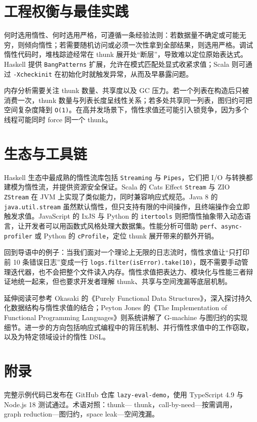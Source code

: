 \chapter{工程权衡与最佳实践}
何时选用惰性、何时选用严格，可遵循一条经验法则：若数据量不确定或可能无穷，则倾向惰性；若需要随机访问或必须一次性拿到全部结果，则选用严格。调试惰性代码时，堆栈踪迹经常在 thunk 展开处“断层”，导致难以定位原始表达式。Haskell 提供 \texttt{BangPatterns} 扩展，允许在模式匹配处显式收紧求值；Scala 则可通过 \texttt{-Xcheckinit} 在初始化时就触发异常，从而及早暴露问题。\par
内存分析需要关注 thunk 数量、共享度以及 GC 压力。若一个列表在构造后只被消费一次，thunk 数量与列表长度呈线性关系；若多处共享同一列表，图归约可把空间复杂度降到 \texttt{O(1)}。在高并发场景下，惰性求值还可能引入锁竞争，因为多个线程可能同时 force 同一个 thunk。\par
\chapter{生态与工具链}
Haskell 生态中最成熟的惰性流库包括 \texttt{Streaming} 与 \texttt{Pipes}，它们把 I/O 与转换都建模为惰性流，并提供资源安全保证。Scala 的 Cats Effect \texttt{Stream} 与 ZIO \texttt{ZStream} 在 JVM 上实现了类似能力，同时兼容响应式规范。Java 8 的 \texttt{java.util.stream} 虽然默认惰性，但只支持有限的中间操作，且终端操作会立即触发求值。JavaScript 的 IxJS 与 Python 的 \texttt{itertools} 则把惰性抽象带入动态语言，让开发者可以用函数式风格处理大数据集。性能分析可借助 \texttt{perf}、\texttt{async-profiler} 或 Python 的 \texttt{cProfile}，定位 thunk 展开带来的额外开销。\par
回到导语中的例子：当我们面对一个理论上无限的日志流时，惰性求值让“只打印前 10 条错误日志”变成一行 \texttt{logs.filter(isError).take(10)}，既不需要手动管理迭代器，也不会把整个文件读入内存。惰性求值把表达力、模块化与性能三者辩证地统一起来，但也要求开发者理解 thunk、共享与空间洩漏等底层机制。\par
延伸阅读可参考 Okasaki 的《Purely Functional Data Structures》，深入探讨持久化数据结构与惰性求值的结合；Peyton Jones 的《The Implementation of Functional Programming Languages》则系统讲解了 G-machine 与图归约的实现细节。进一步的方向包括响应式编程中的背压机制、并行惰性求值中的工作窃取，以及为特定领域设计的惰性 DSL。\par
\chapter{附录}
完整示例代码已发布在 GitHub 仓库 \texttt{lazy-eval-demo}，使用 TypeScript 4.9 与 Node.js 18 测试通过。术语对照：thunk— thunk，call-by-need—按需调用，graph reduction—图归约，space leak—空间洩漏。\par
